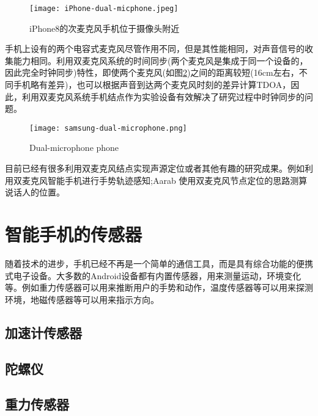 \documentclass[winfonts]{njuthesis}
\begin{document}
		\begin{figure}[htbp]
			\centering
			\texttt{[image: iPhone-dual-micphone.jpeg]} 
			\caption{iPhone8的次麦克风手机位于摄像头附近}
			\label{fig:iphone-dual-microphone}
		\end{figure}
	
		手机上设有的两个电容式麦克风尽管作用不同，但是其性能相同，对声音信号的收集能力相同。利用双麦克风系统的时间同步(两个麦克风是集成于同一个设备的，因此完全时钟同步)特性，即使两个麦克风(如图\ref{fig:samsung-dual-microphone})之间的距离较短(16cm左右，不同手机略有差异)，也可以根据声音到达两个麦克风时刻的差异计算TDOA，因此，利用双麦克风系统手机结点作为实验设备有效解决了研究过程中时钟同步的问题。
		
		\begin{figure}[htbp]
			\centering
			\texttt{[image: samsung-dual-microphone.png]} 
			\caption{Dual-microphone phone}
			\label{fig:samsung-dual-microphone}
		\end{figure}
	
		目前已经有很多利用双麦克风结点实现声源定位或者其他有趣的研究成果。例如利用双麦克风智能手机进行手势轨迹感知\cite{VSkin};Aarab 使用双麦克风节点定位的思路测算说话人的位置\cite{DMArrays}。
		
	\section{智能手机的传感器}
	
		随着技术的进步，手机已经不再是一个简单的通信工具，而是具有综合功能的便携式电子设备。大多数的Android设备都有内置传感器，用来测量运动，环境变化等。例如重力传感器可以用来推断用户的手势和动作，温度传感器等可以用来探测环境，地磁传感器等可以用来指示方向。
		
		\subsection{加速计传感器}
		
		
			
		\subsection{陀螺仪}
		\subsection{重力传感器}
\end{document}
